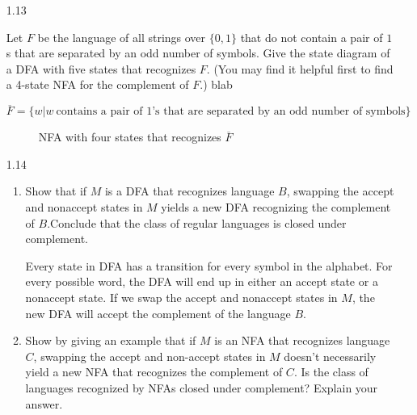 \begin{enumerate}

    \item [1.13]
          
          Let $F$ be the language of all strings over $\{0,1\}$ that do not contain a pair of $1$s that are separated by an odd number of symbols. Give the state diagram of a DFA with five states that recognizes $F$. (You may find it helpful first to find a 4-state NFA for the complement of $F$.) blab
          
          $\overline{F} = \{w|w~ \text{contains a pair of }1\text{'s that are separated by an odd number of symbols}\}$
          
          \begin{figure}[H]
              \centering
              \caption{NFA with four states that recognizes $\overline{F}$}
          \end{figure}
    \item [1.14]
          \begin{enumerate}
              \item Show that if $M$ is a DFA that recognizes language $B$, swapping the accept and nonaccept states in $M$ yields a new DFA recognizing the complement of $B$.Conclude that the class of regular languages is closed under complement.
                    
                    Every state in DFA has a transition for every symbol in the alphabet. For every possible word, the DFA will end up in either an accept state or a nonaccept state. If we swap the accept and nonaccept states in $M$, the new DFA will accept the complement of the language $B$.
                    
              \item Show by giving an example that if $M$ is an NFA that recognizes language $C$, swapping the accept and non-accept states in $M$ doesn’t necessarily yield a new NFA that recognizes the complement of $C$. Is the class of languages recognized by NFAs closed under complement? Explain your answer.
                    

\end{enumerate}
\end{enumerate}
